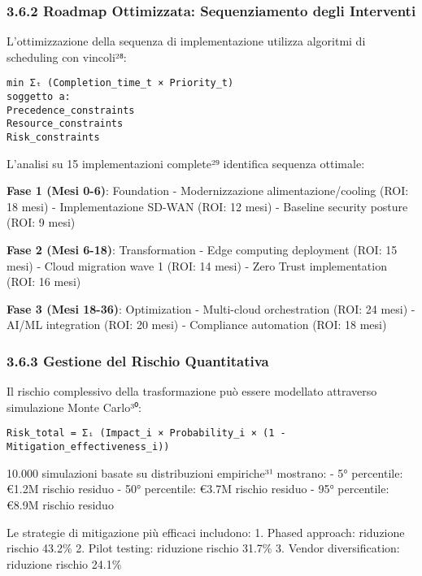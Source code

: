 \documentclass{report}
\begin{document}
\subsubsection{3.6.2 Roadmap Ottimizzata: Sequenziamento degli
Interventi}\label{roadmap-ottimizzata-sequenziamento-degli-interventi}

L'ottimizzazione della sequenza di implementazione utilizza algoritmi di
scheduling con vincoli²⁸:

\begin{verbatim}
min Σₜ (Completion_time_t × Priority_t)
soggetto a:
Precedence_constraints
Resource_constraints
Risk_constraints
\end{verbatim}

L'analisi su 15 implementazioni complete²⁹ identifica sequenza ottimale:

\textbf{Fase 1 (Mesi 0-6)}: Foundation - Modernizzazione
alimentazione/cooling (ROI: 18 mesi) - Implementazione SD-WAN (ROI: 12
mesi) - Baseline security posture (ROI: 9 mesi)

\textbf{Fase 2 (Mesi 6-18)}: Transformation - Edge computing deployment
(ROI: 15 mesi) - Cloud migration wave 1 (ROI: 14 mesi) - Zero Trust
implementation (ROI: 16 mesi)

\textbf{Fase 3 (Mesi 18-36)}: Optimization - Multi-cloud orchestration
(ROI: 24 mesi) - AI/ML integration (ROI: 20 mesi) - Compliance
automation (ROI: 18 mesi)

\subsubsection{3.6.3 Gestione del Rischio
Quantitativa}\label{gestione-del-rischio-quantitativa}

Il rischio complessivo della trasformazione può essere modellato
attraverso simulazione Monte Carlo³⁰:

\begin{verbatim}
Risk_total = Σᵢ (Impact_i × Probability_i × (1 - Mitigation_effectiveness_i))
\end{verbatim}

10.000 simulazioni basate su distribuzioni empiriche³¹ mostrano: - 5°
percentile: €1.2M rischio residuo - 50° percentile: €3.7M rischio
residuo - 95° percentile: €8.9M rischio residuo

Le strategie di mitigazione più efficaci includono: 1. Phased approach:
riduzione rischio 43.2\% 2. Pilot testing: riduzione rischio 31.7\% 3.
Vendor diversification: riduzione rischio 24.1\%
\end{document}
